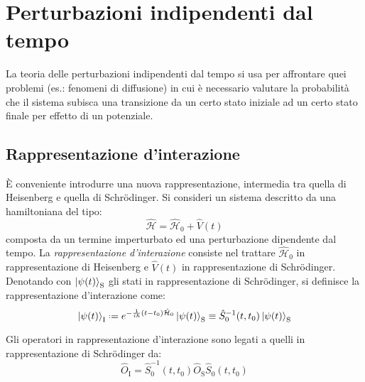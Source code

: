 \section{Perturbazioni indipendenti dal tempo}

La teoria delle perturbazioni indipendenti dal tempo si usa per affrontare quei problemi (es.: fenomeni di diffusione) in cui è necessario valutare la probabilità che il sistema subisca una transizione da un certo stato iniziale ad un certo stato finale per effetto di un potenziale.

\subsection{Rappresentazione d'interazione}

È conveniente introdurre una nuova rappresentazione, intermedia tra quella di Heisenberg e quella di Schrödinger.
Si consideri un sistema descritto da una hamiltoniana del tipo:
\begin{equation}
	\hat{\mathcal{H}} = \hat{\mathcal{H}}_0 + \hat{V}(t)
	\label{eq:5.15}
\end{equation}
composta da un termine imperturbato ed una perturbazione dipendente dal tempo. La \textit{rappresentazione d'interazione} consiste nel trattare $ \hat{\mathcal{H}}_0 $ in rappresentazione di Heisenberg e $ \hat{V}(t) $ in rappresentazione di Schrödinger. Denotando con $ \ket{\psi(t)}_{\text{S}} $ gli stati in rappresentazione di Schrödinger, si definisce la rappresentazione d'interazione come:
\begin{equation}
	\ket{\psi(t)}_{\text{I}} \defeq e^{-\frac{1}{i\hbar} (t - t_0) \hat{\mathcal{H}}_0} \ket{\psi(t)}_{\text{S}} \equiv \hat{S}_0^{-1}(t,t_0) \ket{\psi(t)}_{\text{S}}
	\label{eq:5.16}
\end{equation}

\begin{proposition}
	Gli operatori in rappresentazione d'interazione sono legati a quelli in rappresentazione di Schrödinger da:
	\begin{equation}
		\hat{O}_{\text{I}} = \hat{S}_0^{-1}(t,t_0) \hat{O}_{\text{S}} \hat{S}_0(t,t_0)
		\label{eq:5.17}
	\end{equation}
\end{proposition}

